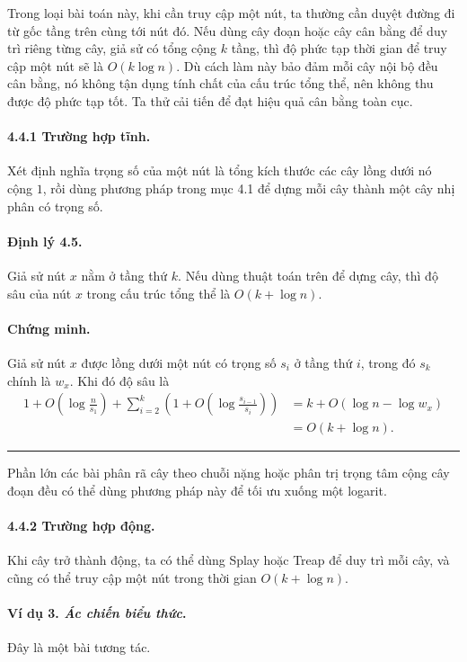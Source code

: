 \documentclass[11pt]{article}
\newcommand{\qedmark}{\hfill\rule{0.7ex}{0.7ex}}
\begin{document}
Trong loại bài toán này, khi cần truy cập một nút, ta thường cần duyệt đường đi
từ gốc tầng trên cùng tới nút đó. Nếu dùng cây đoạn hoặc cây cân bằng để duy
trì riêng từng cây, giả sử có tổng cộng \(k\) tầng, thì độ phức tạp thời gian
để truy cập một nút sẽ là \(O(k\log n)\). Dù cách làm này bảo đảm mỗi cây nội
bộ đều cân bằng, nó không tận dụng tính chất của cấu trúc tổng thể, nên không
thu được độ phức tạp tốt. Ta thử cải tiến để đạt hiệu quả cân bằng toàn cục.

\paragraph{4.4.1 Trường hợp tĩnh.}
Xét định nghĩa trọng số của một nút là tổng kích thước các cây lồng dưới nó
cộng \(1\), rồi dùng phương pháp trong mục 4.1 để dựng mỗi cây thành một cây
nhị phân có trọng số.

\paragraph{Định lý 4.5.}
Giả sử nút \(x\) nằm ở tầng thứ \(k\). Nếu dùng thuật toán trên để dựng cây,
thì độ sâu của nút \(x\) trong cấu trúc tổng thể là \(O(k+\log n)\).

\paragraph{Chứng minh.}
Giả sử nút \(x\) được lồng dưới một nút có trọng số \(s_i\) ở tầng thứ \(i\),
trong đó \(s_k\) chính là \(w_x\). Khi đó độ sâu là
\[
\begin{aligned}
  1+O\left(\log\frac{n}{s_1}\right)
  +\sum_{i=2}^{k}\left(1+O\left(\log\frac{s_{i-1}}{s_i}\right)\right)
  &=k+O(\log n-\log w_x)\\
  &=O(k+\log n).
\end{aligned}
\]
\qedmark

Phần lớn các bài phân rã cây theo chuỗi nặng hoặc phân trị trọng tâm cộng cây
đoạn đều có thể dùng phương pháp này để tối ưu xuống một logarit.

\paragraph{4.4.2 Trường hợp động.}
Khi cây trở thành động, ta có thể dùng Splay hoặc Treap để duy trì mỗi cây, và
cũng có thể truy cập một nút trong thời gian \(O(k+\log n)\).

\paragraph{Ví dụ 3. \emph{Ác chiến biểu thức}.}
Đây là một bài tương tác.
\end{document}
